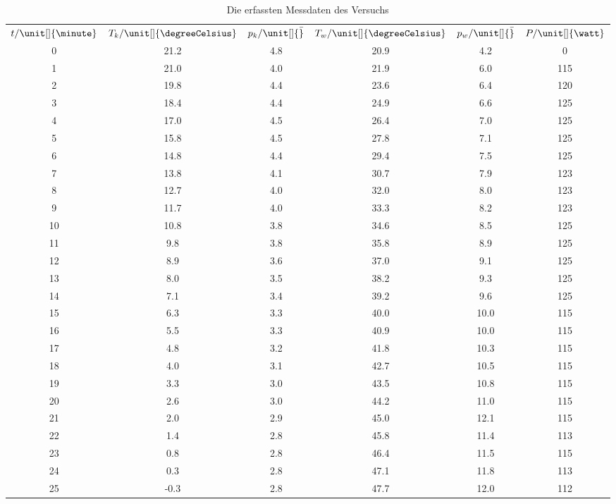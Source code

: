 \begin{table}
    \centering
    \begin{tabular}[]{S[table-format=2.0] S S[table-format=1.1] S S S[table-format=3.0]}
        \toprule
        {$t / \unit[]{\minute}$} & {$T_k / \unit[]{\degreeCelsius}$} & {$p_k / \unit[]{\bar}$} & {$T_w / \unit[]{\degreeCelsius}$} & {$p_w / \unit[]{\bar}$} & {$P / \unit[]{\watt}$} \\
        0 & 21.2  &  4.8 & 20.9  &   4.2  &  0   \\  
        1 & 21.0  &  4.0 & 21.9  &   6.0  &  115 \\
        2 & 19.8  &  4.4 & 23.6  &   6.4  &  120 \\
        3 & 18.4  &  4.4 & 24.9  &   6.6  &  125 \\
        4 & 17.0  &  4.5 & 26.4  &   7.0  &  125 \\
        5 & 15.8  &  4.5 & 27.8  &   7.1  &  125 \\
        6 & 14.8  &  4.4 & 29.4  &   7.5  &  125 \\
        7 & 13.8  &  4.1 & 30.7  &   7.9  &  123 \\
        8 & 12.7  &  4.0 & 32.0  &   8.0  &  123 \\
        9 & 11.7  &  4.0 & 33.3  &   8.2  &  123 \\
       10 & 10.8  &  3.8 & 34.6  &   8.5  &  125 \\
       11 &  9.8  &  3.8 & 35.8  &   8.9  &  125 \\
       12 &  8.9  &  3.6 & 37.0  &   9.1  &  125 \\
       13 &  8.0  &  3.5 & 38.2  &   9.3  &  125 \\
       14 &  7.1  &  3.4 & 39.2  &   9.6  &  125 \\
       15 &  6.3  &  3.3 & 40.0  &  10.0  &  115 \\
       16 &  5.5  &  3.3 & 40.9  &  10.0  &  115 \\
       17 &  4.8  &  3.2 & 41.8  &  10.3  &  115 \\
       18 &  4.0  &  3.1 & 42.7  &  10.5  &  115 \\
       19 &  3.3  &  3.0 & 43.5  &  10.8  &  115 \\
       20 &  2.6  &  3.0 & 44.2  &  11.0  &  115 \\
       21 &  2.0  &  2.9 & 45.0  &  12.1  &  115 \\
       22 &  1.4  &  2.8 & 45.8  &  11.4  &  113 \\
       23 &  0.8  &  2.8 & 46.4  &  11.5  &  115 \\
       24 &  0.3  &  2.8 & 47.1  &  11.8  &  113 \\
       25 & -0.3  &  2.8 & 47.7  &  12.0  &  112 \\
    \end{tabular}
    \label{tab:messdaten}
    \caption[]{Die erfassten Messdaten des Versuchs}
\end{table}